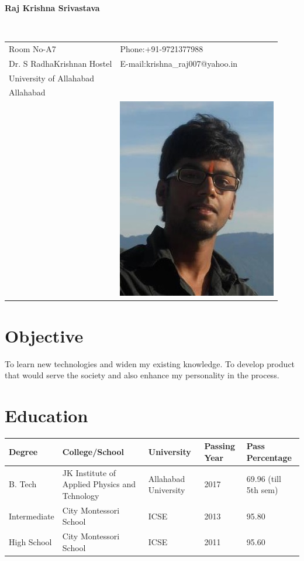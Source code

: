 \documentclass[12pt]{article}
\begin{document}
\vspace{0.5in}
\begin{center}\begin{large}\textbf{Raj Krishna Srivastava}\end{large}\end{center}\textbf{\hrulefill}\\

\begin{tabular}{@{}p{4in}p{3in}}
Room No-A7 & {Phone:}+91-9721377988 \\
Dr. S RadhaKrishnan Hostel & {E-mail:}krishna\_raj007@yahoo.in\\
University of Allahabad \\
Allahabad\\
& \includegraphics[scale=0.4]{rajKrishna.jpg}\\
\end{tabular}
\section*{Objective}
To learn new technologies and widen my existing knowledge. To develop product that would serve the society and also enhance my personality in the process.   
\section*{Education}
\begin{tabular}{|l|l|l|l|l|}
\hline
Degree & College/School & University & Passing Year & Pass Percentage\\
\hline
B. Tech & JK Institute of Applied Physics and Tchnology & Allahabad University & 2017 & 69.96 (till 5th sem)\\
\hline
Intermediate & City Montessori School & ICSE & 2013 & 95.80\\
\hline
High School & City Montessori School & ICSE & 2011 & 95.60\\
\hline
\end{tabular}
\end{document}
